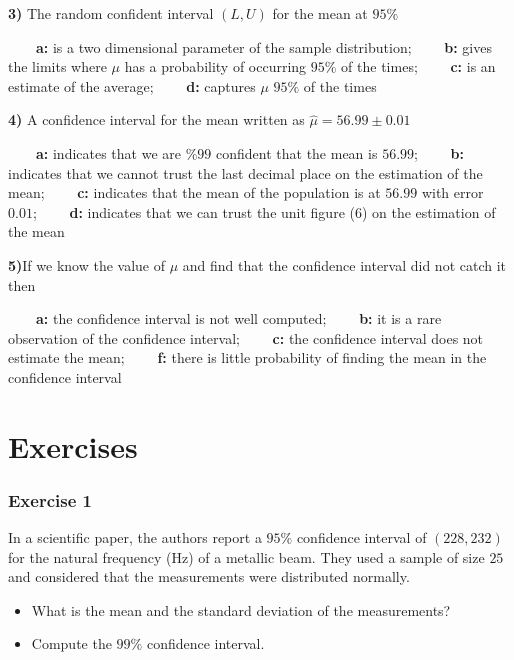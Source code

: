 \documentclass[
]{book}
\begin{document}
\textbf{3)} The random confident interval \((L,U)\) for the mean at \(95\%\)

\textbf{\(\qquad\)a:} is a two dimensional parameter of the sample distribution;
\textbf{\(\qquad\)b:} gives the limits where \(\mu\) has a probability of occurring \(95\%\) of the times;
\textbf{\(\qquad\)c:} is an estimate of the average;
\textbf{\(\qquad\)d:} captures \(\mu\) \(95\%\) of the times

\textbf{4)} A confidence interval for the mean written as \(\hat{\mu}=56.99 \pm 0.01\)

\textbf{\(\qquad\)a:} indicates that we are \(\%99\) confident that the mean is \(56.99\);
\textbf{\(\qquad\)b:} indicates that we cannot trust the last decimal place on the estimation of the mean;
\textbf{\(\qquad\)c:} indicates that the mean of the population is at \(56.99\) with error \(0.01\);
\textbf{\(\qquad\)d:} indicates that we can trust the unit figure (\(6\)) on the estimation of the mean

\textbf{5)}If we know the value of \(\mu\) and find that the confidence interval did not catch it then

\textbf{\(\qquad\)a:} the confidence interval is not well computed;
\textbf{\(\qquad\)b:} it is a rare observation of the confidence interval;
\textbf{\(\qquad\)c:} the confidence interval does not estimate the mean;
\textbf{\(\qquad\)f:} there is little probability of finding the mean in the confidence interval

\hypertarget{exercises-11}{%
\section{Exercises}\label{exercises-11}}

\hypertarget{exercise-1-11}{%
\subsubsection{Exercise 1}\label{exercise-1-11}}

In a scientific paper, the authors report a \(95\%\) confidence interval of \((228, 232)\) for the natural frequency (Hz) of a metallic beam. They used a sample of size \(25\) and considered that the measurements were distributed normally.

\begin{itemize}
\item
  What is the mean and the standard deviation of the measurements?
\item
  Compute the \(99\%\) confidence interval.
\end{itemize}
\end{document}
